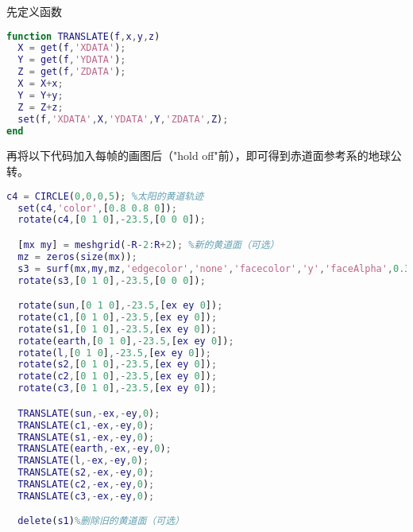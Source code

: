 先定义函数
\begin{lstlisting}[language=matlab]
function TRANSLATE(f,x,y,z)
  X = get(f,'XDATA');
  Y = get(f,'YDATA');
  Z = get(f,'ZDATA');
  X = X+x;
  Y = Y+y;
  Z = Z+z;
  set(f,'XDATA',X,'YDATA',Y,'ZDATA',Z);
end

\end{lstlisting}
再将以下代码加入每帧的画图后（"hold off"前），即可得到赤道面参考系的地球公转。
\begin{lstlisting}[language=matlab]
  c4 = CIRCLE(0,0,0,5); %太阳的黄道轨迹
  set(c4,'color',[0.8 0.8 0]);
  rotate(c4,[0 1 0],-23.5,[0 0 0]);

  [mx my] = meshgrid(-R-2:R+2); %新的黄道面（可选）
  mz = zeros(size(mx));
  s3 = surf(mx,my,mz,'edgecolor','none','facecolor','y','faceAlpha',0.3); %黄道面
  rotate(s3,[0 1 0],-23.5,[0 0 0]);

  rotate(sun,[0 1 0],-23.5,[ex ey 0]);
  rotate(c1,[0 1 0],-23.5,[ex ey 0]);
  rotate(s1,[0 1 0],-23.5,[ex ey 0]);
  rotate(earth,[0 1 0],-23.5,[ex ey 0]);
  rotate(l,[0 1 0],-23.5,[ex ey 0]);
  rotate(s2,[0 1 0],-23.5,[ex ey 0]);
  rotate(c2,[0 1 0],-23.5,[ex ey 0]);
  rotate(c3,[0 1 0],-23.5,[ex ey 0]);

  TRANSLATE(sun,-ex,-ey,0);
  TRANSLATE(c1,-ex,-ey,0);
  TRANSLATE(s1,-ex,-ey,0);
  TRANSLATE(earth,-ex,-ey,0);
  TRANSLATE(l,-ex,-ey,0);
  TRANSLATE(s2,-ex,-ey,0);
  TRANSLATE(c2,-ex,-ey,0);
  TRANSLATE(c3,-ex,-ey,0);

  delete(s1)%删除旧的黄道面（可选）
\end{lstlisting}

